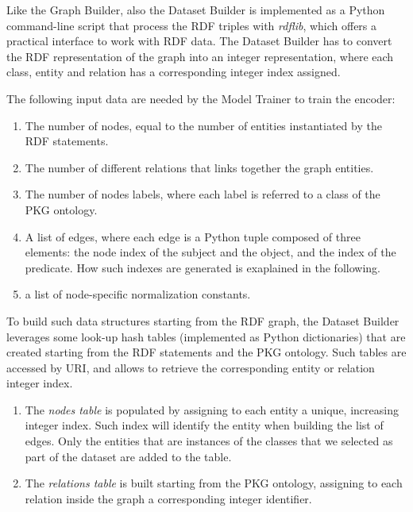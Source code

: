 \documentclass[%
    corpo=13.5pt,
    twoside,
    oldstyle,
    tipotesi=magistrale,
    greek,
    evenboxes
]{toptesi}
\begin{document}
Like the Graph Builder, also the Dataset Builder is implemented as a
Python command-line script that process the RDF triples with \emph{rdflib},
which offers a practical interface to work with RDF data.
The Dataset Builder has to convert the RDF representation of the graph into
an integer representation, where each class, entity and relation has a
corresponding integer index assigned.

The following input data are needed by the Model Trainer to train the
encoder:

\begin{enumerate}
    \item The number of nodes, equal to the number of entities instantiated by
        the RDF statements.
    \item The number of different relations that links together the graph
        entities.
    \item The number of nodes labels, where each label is referred to a class of
        the PKG ontology.
    \item A list of edges, where each edge is a Python tuple composed of three
        elements: the node index of the subject and the object, and the
        index of the predicate. How such indexes are generated is
        exaplained in the following.
    \item a list of node-specific normalization constants.
\end{enumerate}

To build such data structures starting from the RDF graph, the Dataset Builder
leverages some look-up hash tables (implemented as Python dictionaries) that are
created starting from the RDF statements and the PKG ontology. Such tables
are accessed by URI, and allows to retrieve the corresponding entity or
relation integer index.

\begin{enumerate}
    \item The \emph{nodes table} is populated by assigning to each entity
    a unique, increasing integer index. Such index will identify the entity when
    building the list of edges. Only the entities that are instances of the
    classes that we selected as part of the dataset are added to the table.

    \item The \emph{relations table} is built starting from the PKG ontology,
    assigning to each relation inside the graph a corresponding integer
    identifier.
\end{enumerate}
\end{document}
